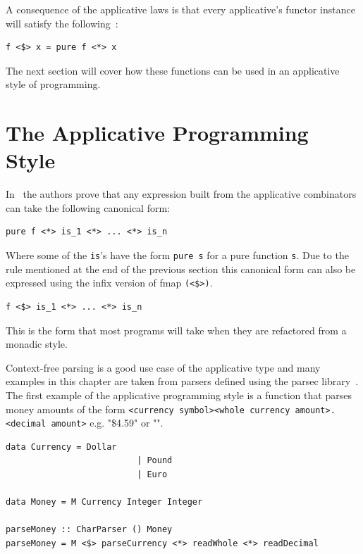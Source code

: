 A consequence of the applicative laws is that every applicative's functor instance will satisfy the following~\citep{control.applicative}: 

\begin{lstlisting}[frame=tblr]
f <$> x = pure f <*> x
\end{lstlisting}

The next section will cover how these functions can be used in an applicative style of programming. 

\section{The Applicative Programming Style}
\label{sec:appProgStyle}

In~\cite{mcbrideIdioms} the authors prove that any expression built from the applicative combinators can take the following canonical form:

\begin{lstlisting}[frame=tblr]
pure f <*> is_1 <*> ... <*> is_n
\end{lstlisting}


Where some of the \texttt{is}'s have the form \texttt{pure s} for a pure function \texttt{s}. Due to the rule mentioned at the end of the previous section this canonical form can also be expressed using the infix version of fmap \texttt{(<\$>)}. 

\begin{lstlisting}[frame=tblr]
f <$> is_1 <*> ... <*> is_n
\end{lstlisting}

This is the form that most programs will take when they are refactored from a monadic style. 


 Context-free parsing is a good use case of the applicative type and many examples in this chapter are taken from parsers defined using the parsec library~\citep{parsec}. The first example of the applicative programming style is a function that parses money amounts of the form \texttt{<currency symbol><whole currency amount>.<decimal amount>} e.g. "\$4.59" or "".
 
 \begin{lstlisting}[frame=tblr]
 data Currency = Dollar
                          | Pound
                          | Euro
              
data Money = M Currency Integer Integer

parseMoney :: CharParser () Money
parseMoney = M <$> parseCurrency <*> readWhole <*> readDecimal
 \end{lstlisting}
 

